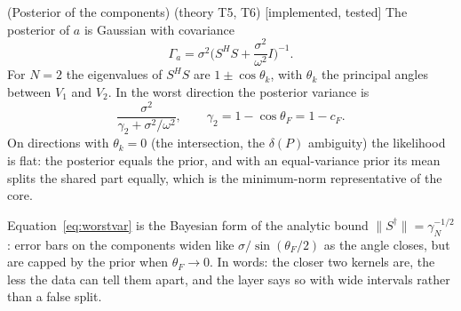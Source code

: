 \documentclass[11pt,a4paper]{article}
\theoremstyle{definition}
\newcommand{\badge}[2]{\textcolor{#1}{\textsf{\footnotesize[#2]}}}
\newcommand{\impl}{\badge{cC}{implemented, tested}}
\newcommand{\thy}[1]{\textcolor{cG}{\textsf{\footnotesize(theory #1)}}}
\begin{document}
\begin{theorem}{(Posterior of the components) \thy{T5, T6} \impl}\label{thm:bsplit}
The posterior of $a$ is Gaussian with covariance
\begin{equation}\label{eq:postcov}
\Gamma_a=\sigma^2\Big(S^{H}S+\frac{\sigma^2}{\omega^2}I\Big)^{-1}.
\end{equation}
For $N=2$ the eigenvalues of $S^{H}S$ are $1\pm\cos\theta_k$, with $\theta_k$ the principal angles between $V_1$ and $V_2$. In the worst direction the posterior variance is
\begin{equation}\label{eq:worstvar}
\frac{\sigma^2}{\gamma_2+\sigma^2/\omega^2},\qquad \gamma_2=1-\cos\theta_F=1-c_F.
\end{equation}
On directions with $\theta_k=0$ (the intersection, the $\delta(P)$ ambiguity) the likelihood is flat: the posterior equals the prior, and with an equal-variance prior its mean splits the shared part equally, which is the minimum-norm representative of the core.
\end{theorem}
\begin{intuition}
Equation~\eqref{eq:worstvar} is the Bayesian form of the analytic bound $\|S^{\dagger}\|=\gamma_N^{-1/2}$: error bars on the components widen like $\sigma/\sin(\theta_F/2)$ as the angle closes, but are capped by the prior when $\theta_F\to0$. In words: the closer two kernels are, the less the data can tell them apart, and the layer says so with wide intervals rather than a false split.
\end{intuition}
\end{document}
